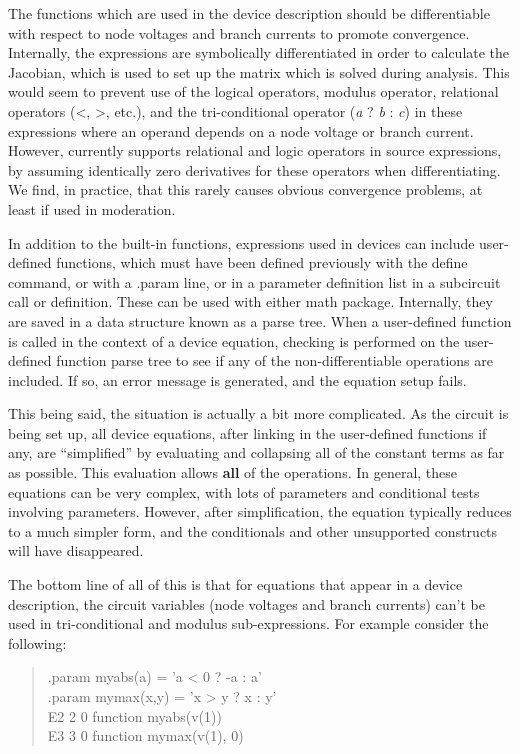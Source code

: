 The functions which are used in the device description should be
differentiable with respect to node voltages and branch currents to
promote convergence.  Internally, the expressions are symbolically
differentiated in order to calculate the Jacobian, which is used to
set up the matrix which is solved during analysis.  This would seem to
prevent use of the logical operators, modulus operator, relational
operators ({\vt <}, {\vt >}, etc.), and the tri-conditional operator
({\it a} {\vt ?} {\it b} {\vt :} {\it c\/}) in these expressions where
an operand depends on a node voltage or branch current.  However,
{\WRspice} currently supports relational and logic operators in source
expressions, by assuming identically zero derivatives for these
operators when differentiating.  We find, in practice, that this
rarely causes obvious convergence problems, at least if used in
moderation.

In addition to the built-in functions, expressions used in devices can
include user-defined functions, which must have been defined
previously with the {\cb define} command, or with a {\vt .param} line,
or in a parameter definition list in a subcircuit call or definition. 
These can be used with either math package.  Internally, they are
saved in a data structure known as a parse tree.  When a user-defined
function is called in the context of a device equation, checking is
performed on the user-defined function parse tree to see if any of the
non-differentiable operations are included.  If so, an error message
is generated, and the equation setup fails.

This being said, the situation is actually a bit more complicated.  As
the circuit is being set up, all device equations, after linking in
the user-defined functions if any, are ``simplified'' by evaluating
and collapsing all of the constant terms as far as possible.  This
evaluation allows {\bf all} of the operations.  In general, these
equations can be very complex, with lots of parameters and conditional
tests involving parameters.  However, after simplification, the
equation typically reduces to a much simpler form, and the
conditionals and other unsupported constructs will have disappeared.

The bottom line of all of this is that for equations that appear in a
device description, the circuit variables (node voltages and branch
currents) can't be used in tri-conditional and modulus
sub-expressions.  For example consider the following:

\begin{quote}\vt
.param myabs(a) = 'a < 0 ? -a : a'\\
.param mymax(x,y) = 'x > y ? x : y'\\
E2 2 0 function myabs(v(1))\\
E3 3 0 function mymax(v(1), 0)
\end{quote}

